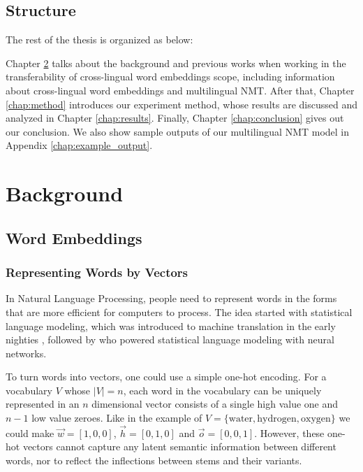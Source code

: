 \documentclass[thesis]{cluu}
\begin{document}
\section{Structure}

The rest of the thesis is organized as below:

Chapter \ref{chap:background} talks about the background and previous works when working in the transferability of cross-lingual word embeddings scope, including information about cross-lingual word embeddings and multilingual NMT. After that, Chapter \ref{chap:method} introduces our experiment method, whose results are discussed and analyzed in Chapter \ref{chap:results}. Finally, Chapter \ref{chap:conclusion} gives out our conclusion. We also show sample outputs of our multilingual NMT model in Appendix \ref{chap:example_output}.

\chapter{Background}
\label{chap:background}

\section{Word Embeddings}
\subsection{Representing Words by Vectors}

In Natural Language Processing, people need to represent words in the forms that are more efficient for computers to process. The idea started with statistical language modeling, which was introduced to machine translation in the early nighties \parencite{brown-etal-1990-statistical}, followed by \textcite{bengio2003neural} who powered statistical language modeling with neural networks.

To turn words into vectors, one could use a simple one-hot encoding. For a vocabulary $V$ whose $|V|=n$, each word in the vocabulary can be uniquely represented in an $n$ dimensional vector consists of a single high value one and $n-1$ low value zeroes. Like in the example of $V=\{\text{water}, \text{hydrogen}, \text{oxygen}\}$ we could make $\vec{w}=[1, 0, 0]$, $\vec{h}=[0, 1, 0]$ and $\vec{o}=[0, 0, 1]$. However, these one-hot vectors cannot capture any latent semantic information between different words, nor to reflect the inflections between stems and their variants.
\end{document}
